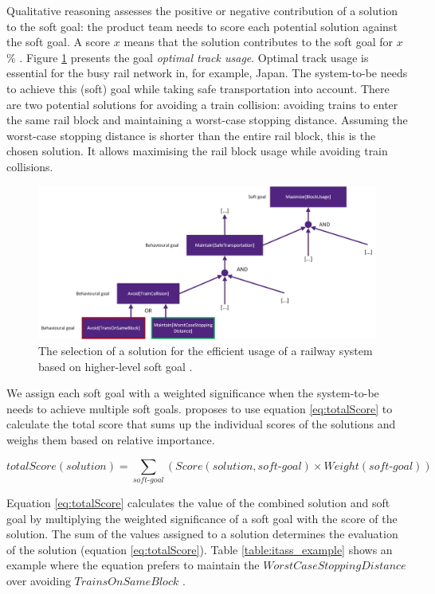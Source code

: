 Qualitative reasoning assesses the positive or negative contribution of a solution to the soft goal: the product team needs to score each potential solution against the soft goal. A score $x$ means that the solution contributes to the soft goal for $x$\% \parencite{BK04}. Figure \ref{fig:sg} presents the goal \emph{optimal track usage}. Optimal track usage is essential for the busy rail network in, for example, Japan. The system-to-be needs to achieve this (soft) goal while taking safe transportation into account. There are two potential solutions for avoiding a train collision: avoiding trains to enter the same rail block and maintaining a worst-case stopping distance. Assuming the worst-case stopping distance is shorter than the entire rail block, this is the chosen solution. It allows maximising the rail block usage while avoiding train collisions.

\begin{figure}[H]
\centering
  \includegraphics[width=17cm]{../../Images/SoftGoal.png}
  \caption{The selection of a solution for the efficient usage of a railway system based on higher-level soft goal \parencite{BK04}.}
  \label{fig:sg}
\end{figure}

We assign each soft goal with a weighted significance when the system-to-be needs to achieve multiple soft goals. \cite{BK04} proposes to use equation \ref{eq:totalScore} to calculate the total score that sums up the individual scores of the solutions and weighs them based on relative importance.

\begin{equation} \label{eq:totalScore}
totalScore(solution)=\sum_{soft\text{-}goal} (Score(solution,soft\text{-}goal) \times Weight(soft\text{-}goal)) 
\end{equation}

Equation \ref{eq:totalScore} calculates the value of the combined solution and soft goal by multiplying the weighted significance of a soft goal with the score of the solution. The sum of the values assigned to a solution determines the evaluation of the solution (equation \ref{eq:totalScore}). Table \ref{table:itass_example} shows an example where the equation prefers to maintain the $WorstCaseStoppingDistance$ over avoiding $TrainsOnSameBlock$ \parencite{BK04}.

